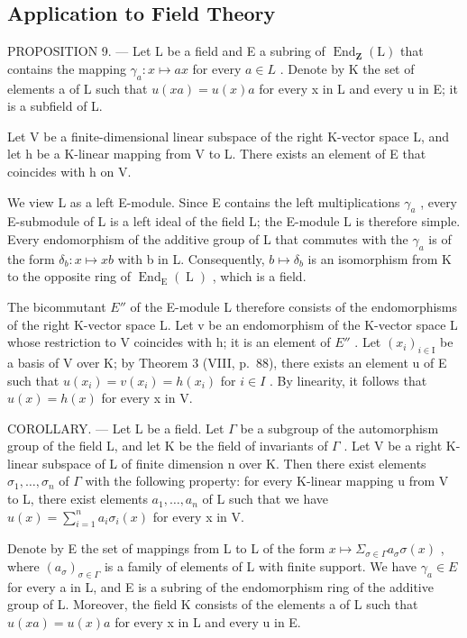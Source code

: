 \subsection{Application to Field Theory}

PROPOSITION 9. --- Let L be a field and E a subring of \(\operatorname{End}_{\mathbf{Z}}(\mathrm{L})\) that contains the mapping \(\gamma_{a}: x \mapsto ax\) for every \(a \in L\) . Denote by K the set of elements a of L such that \(u(xa) = u(x)a\) for every x in L and every u in E; it is a subfield of L.

Let V be a finite-dimensional linear subspace of the right K-vector space L, and let h be a K-linear mapping from V to L. There exists an element of E that coincides with h on V.

We view L as a left E-module. Since E contains the left multiplications \(\gamma_{a}\) , every E-submodule of L is a left ideal of the field L; the E-module L is therefore simple. Every endomorphism of the additive group of L that commutes with the \(\gamma_{a}\) is of the form \(\delta_{b}: x \mapsto xb\) with b in L. Consequently, \(b \mapsto \delta_{b}\) is an isomorphism from K to the opposite ring of \(\operatorname{End}_{\operatorname{E}}(\operatorname{L})\) , which is a field.

The bicommutant \(E''\) of the E-module L therefore consists of the endomorphisms of the right K-vector space L. Let v be an endomorphism of the K-vector space L whose restriction to V coincides with h; it is an element of \(E''\) . Let \((x_{i})_{i\in\mathrm{I}}\) be a basis of V over K; by Theorem 3 (VIII, p.~88), there exists an element u of E such that \(u(x_{i}) = v(x_{i}) = h(x_{i})\) for \(i \in I\) . By linearity, it follows that \(u(x) = h(x)\) for every x in V.

COROLLARY. --- Let L be a field. Let \(\Gamma\) be a subgroup of the automorphism group of the field L, and let K be the field of invariants of \(\Gamma\) . Let V be a right K-linear subspace of L of finite dimension n over K. Then there exist elements \(\sigma_{1},\ldots,\sigma_{n}\) of \(\Gamma\) with the following property: for every K-linear mapping u from V to L, there exist elements \(a_{1},\ldots,a_{n}\) of L such that we have \(u(x)=\sum_{i=1}^{n}a_{i}\sigma_{i}(x)\) for every x in V.

Denote by E the set of mappings from L to L of the form \(x \mapsto \Sigma_{\sigma \in \Gamma} a_{\sigma} \sigma(x)\) , where \((a_{\sigma})_{\sigma \in \Gamma}\) is a family of elements of L with finite support. We have \(\gamma_{a} \in E\) for every a in L, and E is a subring of the endomorphism ring of the additive group of L. Moreover, the field K consists of the elements a of L such that \(u(xa) = u(x)a\) for every x in L and every u in E.

